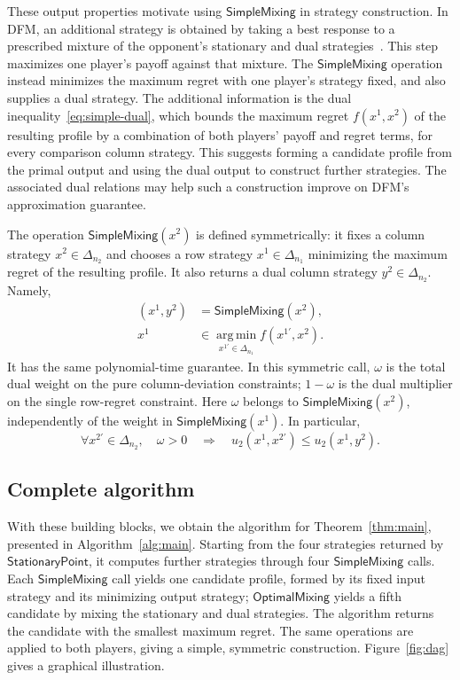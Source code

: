 \documentclass[11pt]{article}
\theoremstyle{remark}
\theoremstyle{plain}
\newcommand{\sm}{\mathsf{SimpleMixing}}
\newcommand{\om}{\mathsf{OptimalMixing}}
\newcommand{\spoint}{\mathsf{StationaryPoint}}
\begin{document}
These output properties motivate using $\sm$ in strategy construction.
In DFM, an additional strategy is obtained by taking a best response to a
prescribed mixture of the opponent's stationary and dual
strategies~\cite{dfm2023}. This step maximizes one player's payoff
against that mixture. The $\sm$ operation instead minimizes the
maximum regret with one player's strategy fixed, and also supplies a
dual strategy. The additional information is the dual
inequality~\eqref{eq:simple-dual}, which bounds the maximum regret
$f(x^1,x^2)$ of the resulting profile by a combination of both
players' payoff and regret terms, for every comparison column
strategy. This suggests forming a
candidate profile from the primal output and using the dual output to
construct further strategies. The associated dual relations may help
such a construction improve on DFM's approximation guarantee.

The operation $\sm(x^2)$ is defined symmetrically: it fixes a
column strategy $x^2\in\Delta_{n_2}$ and chooses a row strategy
$x^1\in\Delta_{n_1}$ minimizing the maximum regret of the resulting
profile. It also returns a dual column strategy $y^2\in\Delta_{n_2}$.
Namely,
\[
 \begin{aligned}
  (x^1,y^2)&=\sm(x^2),\\
  x^1&\in\operatorname*{arg\,min}_{x^{1\prime}\in\Delta_{n_1}}
                   f(x^{1\prime},x^2).
 \end{aligned}
\]
It has the same polynomial-time guarantee. In this symmetric call,
$\omega$ is the total dual weight on the pure column-deviation
constraints; $1-\omega$ is the dual multiplier on the single
row-regret constraint. Here $\omega$ belongs to $\sm(x^2)$,
independently of the weight in $\sm(x^1)$. In particular,
\[
 \forall x^{2\prime}\in\Delta_{n_2},\quad
 \omega>0\quad\Longrightarrow\quad
 u_2(x^1,x^{2\prime})\le u_2(x^1,y^2).
\]

\subsection{Complete algorithm}
\label{sec:complete-algorithm}

With these building blocks, we obtain the algorithm for
Theorem~\ref{thm:main}, presented in Algorithm~\ref{alg:main}.
Starting from the four strategies returned by $\spoint$, it computes
further strategies through four $\sm$ calls. Each $\sm$ call yields
one candidate profile, formed by its fixed input strategy and its
minimizing output strategy; $\om$ yields a fifth candidate by mixing
the stationary and dual strategies. The algorithm returns the
candidate with the smallest maximum regret. The same operations are
applied to both players, giving a simple, symmetric construction.
Figure~\ref{fig:dag} gives a graphical illustration.
\end{document}
